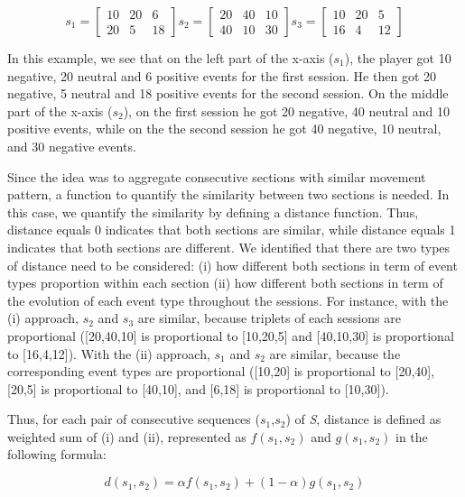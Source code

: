 \documentclass{vgtc}                          %
\begin{document}
\[
\textit{s}_1 = \begin{bmatrix}
  10 & 20 & 6\\
  20 & 5 & 18
\end{bmatrix}
\textit{s}_2 = \begin{bmatrix}
  20 & 40 & 10\\ 
  40 & 10 & 30
\end{bmatrix}
\textit{s}_3 = \begin{bmatrix}
  10 & 20 & 5\\
  16 & 4 & 12 
\end{bmatrix}
\]

In this example, we see that on the left part of the x-axis ($s_1$), the player got 10 negative, 20 neutral and 6 positive events for the first session. He then got 20 negative, 5 neutral and 18 positive events for the second session. On the middle part of the x-axis ($s_2$), on the first session he got 20 negative, 40 neutral and 10 positive events, while on the the second session he got 40 negative, 10 neutral, and 30 negative events.

Since the idea was to aggregate consecutive sections with similar movement pattern, a function to quantify the similarity between two sections is needed. In this case, we quantify the similarity by defining a distance function. Thus, distance equals 0 indicates that both sections are similar, while distance equals 1 indicates that both sections are different. We identified that there are two types of distance need to be considered: (i) how different both sections in term of event types proportion within each section (ii) how different both sections in term of the evolution of each event type throughout the sessions. For instance, with the (i) approach, $s_2$ and $s_3$ are similar, because triplets of each sessions are proportional ([20,40,10] is proportional to [10,20,5] and [40,10,30] is proportional to [16,4,12]). With the (ii) approach, $s_1$ and $s_2$ are similar, because the corresponding event types are proportional ([10,20] is proportional to [20,40], [20,5] is proportional to [40,10], and [6,18] is proportional to [10,30]).

Thus, for each pair of consecutive sequences ($\textit{s}_1$,$\textit{s}_2$) of \textit{S}, distance is defined as weighted sum of (i) and (ii), represented as $\textit{f}(\textit{s}_1,\textit{s}_2)$ and $\textit{g}(\textit{s}_1,\textit{s}_2)$ in the following formula:

$$d(\textit{s}_1,\textit{s}_2) = \alpha\textit{f}(\textit{s}_1,\textit{s}_2) + (1 - \alpha)\textit{g}(\textit{s}_1,\textit{s}_2)$$
\end{document}
